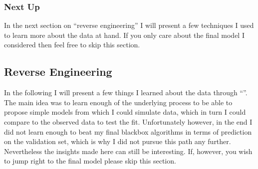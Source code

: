 \documentclass[letterpaper,10pt,english]{sphinxmanual}
\begin{document}
\subsubsection{Next Up}
\label{\detokenize{simulated_intro:next-up}}
In the next section on “reverse engineering” I will present a few techniques I used to learn more about the data at hand. If you only care about the final model I considered then feel free to skip this section.


\subsection{Reverse Engineering}
\label{\detokenize{simulated_reverse_engineering:reverse-engineering}}\label{\detokenize{simulated_reverse_engineering::doc}}
In the following I will present a few things I learned about the data through “”. The main idea was to learn enough of the underlying process to be able to propose simple models from which I could simulate data, which in turn I could compare to the observed data to test the fit. Unfortunately however, in the end I did not learn enough to beat my final black\sphinxhyphen{}box algorithms in terms of prediction on the validation set, which is why I did not pursue this path any further. Nevertheless the insights made here can still be interesting. If, however, you wish to jump right to the final model please skip this section.
\end{document}

